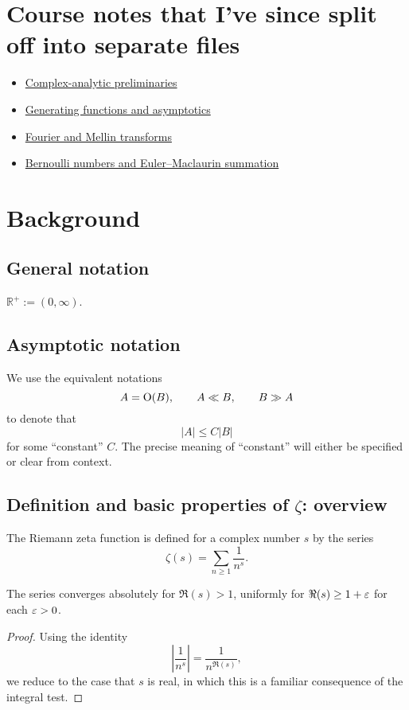 \documentclass[reqno]{amsart}  \numberwithin{theorem}{section} \numberwithin{equation}{section}
\begin{document}
\section{Course notes that I've since split off into separate files}
\begin{itemize}
\item \href{20230907T143521--complex-analysis-preliminaries.pdf}{Complex-analytic preliminaries}
\item \href{20230907T142550--generating-functions-asymptotics.pdf}{Generating functions and asymptotics}
\item \href{20230907T143130--fourier-and-mellin-transforms.pdf}{Fourier and Mellin transforms}
\item \href{20230907T144219--bernoulli-numbers-euler-maclaurin.pdf}{Bernoulli numbers and Euler--Maclaurin summation}
\end{itemize}


\newpage


\section{Background}\label{sec:cj4unj5r3k}

\subsection{General notation}
$\mathbb{R}^+ := (0,\infty)$.

\subsection{Asymptotic notation}
We use the equivalent notations
\begin{equation*}
  A = \operatorname{O}(B), \qquad A \ll B,
  \qquad B \gg A
\end{equation*}
to denote that
\begin{equation*}
  \lvert A \rvert \leq C \lvert B \rvert
\end{equation*}
for some ``constant'' $C$.  The precise meaning of ``constant'' will either be specified or clear from context.


\newpage
\subsection{Definition and basic properties of $\zeta$: overview}
The Riemann zeta function is defined for a complex number $s$ by the series
\begin{equation*}
  \zeta (s) = \sum_{n \geq 1} \frac{1}{n^s }.
\end{equation*}
\begin{lemma}
  The series converges absolutely for $\Re(s) > 1$, uniformly for $\Re(s) \geq 1 + \varepsilon$ for each $\varepsilon > 0$.
\end{lemma}
\begin{proof}
  Using the identity
  \begin{equation*}
    \left\lvert \frac{1}{n^s} \right\rvert = \frac{1}{n^{\Re(s)}},
  \end{equation*}
  we reduce to the case that $s$ is real, in which this is a familiar consequence of the integral test.
\end{proof}
\end{document}

